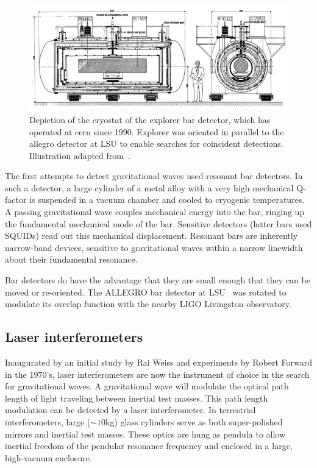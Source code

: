 \begin{figure}
\includegraphics[width=\columnwidth]{chapter1/figures/explorer.png}
\caption[EXPLORER bar detector]{\label{fig:explorer-bar}Depiction of
  the cryostat of the {\sc explorer} bar detector, which has operated
  at {\sc cern} since 1990.  {\sc Explorer} was oriented in parallel
  to the {\sc allegro} detector at LSU\cite{Mauceli1996Allegro} to
  enable searches for coincident detections.  Illustration adapted
  from~\cite{Astone1993Longterm}.}
\end{figure}

The first attempts to detect gravitational waves used resonant bar
detectors\cite{Thorne1980Gravitationalwave,Levine2004Early}.  
In such a detector, a large cylinder of a metal alloy with
a very high mechanical Q-factor is suspended in a vacuum chamber and
cooled to cryogenic temperatures.  A passing gravitational wave
couples mechanical energy into the bar, ringing up the fundamental
mechanical mode of the bar.  Sensitive detectors (latter bars used
SQUIDs) read out this mechanical displacement.  Resonant bars are
inherently narrow-band devices, sensitive to gravitational waves
within a narrow linewidth about their fundamental resonance.

Bar detectors do have the advantage that they are small enough that
they can be moved or re-oriented.  The ALLEGRO bar detector at LSU~\cite{Mauceli1996Allegro} was
rotated to modulate its overlap function with the nearby LIGO
Livingston observatory.%

\subsection{Laser interferometers}

Inaugurated by an initial study by Rai
Weiss\cite{Weiss1972Electromagnetically} and experiments by Robert
Forward\cite{Forward1978Wideband} in the 1970's, 
laser interferometers are now the instrument of choice in the search
for gravitational waves.  A gravitational wave will modulate the
optical path length of light traveling between inertial test masses.
This path length modulation can be detected by a laser interferometer.
%
In terrestrial interferometers, large ($\sim10$kg) glass cylinders
serve as both super-polished mirrors and inertial test masses.  These
optics are hung as pendula to allow inertial freedom of the pendular
resonance frequency and enclosed in a large, high-vacuum enclosure.

